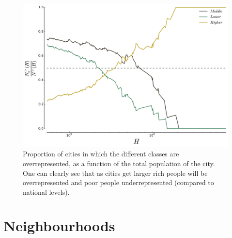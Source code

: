 \begin{figure}
    \centering
    \includegraphics[width=\textwidth]{gfx/chapter-segregation/figure3.pdf}
    \caption{Proportion of cities in which the different classes are
    overrepresented, as a function of the total population of the city. One can
    clearly see that as cities get larger rich people will
    be overrepresented and poor people underrepresented (compared to national
    levels). \label{fig:inter-urban_representation}}
\end{figure}




\section{Neighbourhoods}
\label{sec:neighbourhoods}



